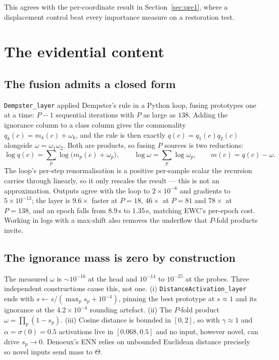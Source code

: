 \documentclass{article}
\begin{document}
This agrees with the per-coordinate result in Section~\ref{sec:pre1}, where a
displacement control beat every importance measure on a restoration test.

\section{The evidential content}

\subsection{The fusion admits a closed form}

\texttt{Dempster\_layer} applied Dempster's rule in a Python loop, fusing
prototypes one at a time: $P-1$ sequential iterations with $P$ as large as $138$.
Adding the ignorance column to a class column gives the commonality
$q_k(c) = m_k(c) + \omega_k$, and the rule is then exactly
$q(c) = q_1(c)q_2(c)$ alongside $\omega = \omega_1\omega_2$. Both are products,
so fusing $P$ sources is two reductions:
\begin{equation}
\log q(c) = \sum_{p} \log\!\big(m_p(c) + \omega_p\big),
\qquad
\log \omega = \sum_{p} \log \omega_p,
\qquad
m(c) = q(c) - \omega .
\label{eq:closedform}
\end{equation}
The loop's per-step renormalisation is a positive per-sample scalar the recursion
carries through linearly, so it only rescales the result --- this is not an
approximation. Outputs agree with the loop to $2\times10^{-6}$ and gradients to
$5\times10^{-13}$; the layer is $9.6\times$ faster at $P=18$, $46\times$ at
$P=81$ and $78\times$ at $P=138$, and an epoch falls from $8.9$\,s to $1.35$\,s,
matching EWC's per-epoch cost. Working in logs with a max-shift also removes the
underflow that $P$-fold products invite.

\subsection{The ignorance mass is zero by construction}

The measured $\omega$ is $\sim10^{-16}$ at the head and $10^{-14}$ to $10^{-25}$
at the probes. Three independent constructions cause this, not one.
(i) \texttt{DistanceActivation\_layer} ends with
$s \leftarrow s/(\max_p s_p + 10^{-4})$, pinning the best prototype at
$s\approx1$ and its ignorance at the $4.2\times10^{-4}$ rounding artefact.
(ii) The $P$-fold product $\omega = \prod_p(1-s_p)$.
(iii) Cosine distance is bounded in $[0,2]$, so with $\gamma\approx1$ and
$\alpha=\sigma(0)=0.5$ activations live in $[0.068, 0.5]$ and no input, however
novel, can drive $s_p \to 0$. Denoeux's ENN relies on unbounded Euclidean
distance precisely so novel inputs send mass to $\Theta$.
\end{document}
